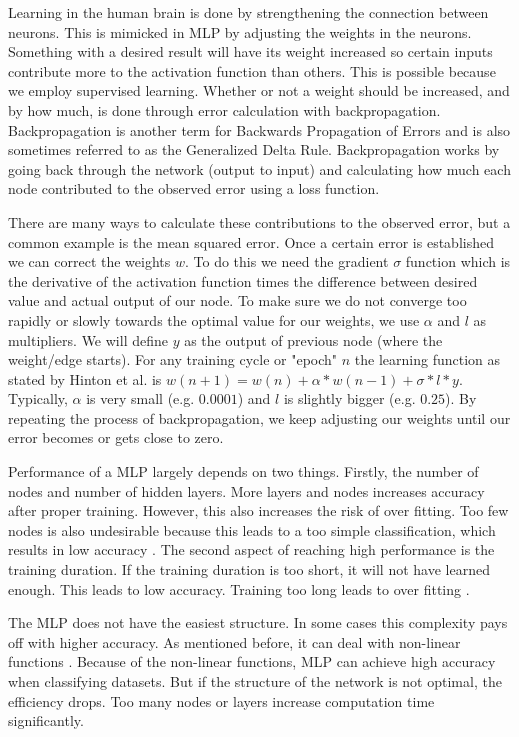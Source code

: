 Learning in the human brain is done by strengthening the connection between neurons. This is mimicked in MLP by adjusting the weights in the neurons. Something with a desired result will have its weight increased so certain inputs contribute more to the activation function than others. This is possible because we employ supervised learning. Whether or not a weight should be increased, and by how much, is done through error calculation with backpropagation. Backpropagation is another term for Backwards Propagation of Errors \cite{rumelhart1985learning} and is also sometimes referred to as the Generalized Delta Rule. Backpropagation works by going back through the network (output to input) and calculating how much each node contributed to the observed error using a loss function. 

There are many ways to calculate these contributions to the observed error, but a common example is the mean squared error. Once a certain error is established we can correct the weights $w$. To do this we need the gradient $\sigma$ function which is the derivative of the activation function times the difference between desired value and actual output of our node. To make sure we do not converge too rapidly or slowly towards the optimal value for our weights, we use $\alpha$ and $l$ as multipliers. We will define $y$ as the output of previous node (where the weight/edge starts). For any training cycle or "epoch" $n$ the learning function as stated by Hinton et al. is $w(n+1)=w(n) + \alpha * w(n-1) + \sigma * l * y$. Typically, $\alpha$ is very small (e.g. $0.0001$) and $l$ is slightly bigger (e.g. $0.25$). By repeating the process of backpropagation, we keep adjusting our weights until our error becomes or gets close to zero.

Performance of a MLP largely depends on two things. Firstly, the number of nodes and number of hidden layers. More layers and nodes increases accuracy after proper training. However, this also increases the risk of over fitting. Too few nodes is also undesirable because this leads to a too simple classification, which results in low accuracy \cite{Murtagh1991183}. 
The second aspect of reaching high performance is the training duration. If the training duration is too short, it will not have learned enough. This leads to low accuracy. Training too long leads to over fitting \cite{caruana2001overfitting}. 

The MLP does not have the easiest structure. In some cases this complexity pays off with higher accuracy. As mentioned before, it can deal with non-linear functions \cite{gardner1998artificial}. Because of the non-linear functions, MLP can achieve high accuracy when classifying datasets. But if the structure of the network is not optimal, the efficiency drops. Too many nodes or layers increase computation time significantly.